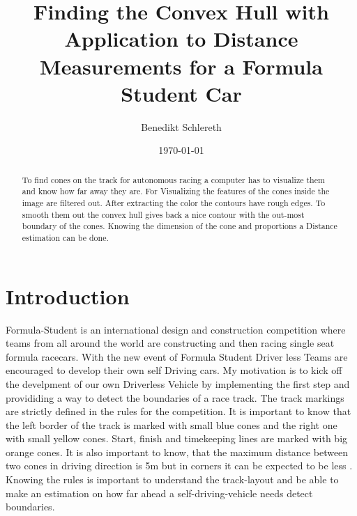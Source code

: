 \documentclass[10pt,a4paper]{article}
\title{Finding the Convex Hull with Application to Distance Measurements for a Formula Student Car}
\author{Benedikt Schlereth}
\date{\today}
\begin{document}
	\maketitle
	\tableofcontents
	\pagebreak
	
	\begin{abstract}
	To find cones on the track for autonomous racing a computer has to visualize them and know how far away they are.
	For Visualizing the features of the cones inside the image are filtered out. After extracting the color the contours have rough edges. To smooth them out the convex hull gives back a nice contour with the out-most boundary of the cones. Knowing the dimension of the cone and proportions a Distance estimation can be done.
	\end{abstract}
	
	\section{Introduction}
	Formula-Student is an international design and construction competition where teams from all around the world are constructing and then racing single seat formula racecars. With	the new event of Formula Student Driver less Teams are encouraged to develop their own self Driving cars.
	My motivation is to kick off the develpment of our own Driverless Vehicle by implementing the first step and provididing a way to detect the boundaries of a race track.
	The track markings are strictly defined in the rules for the competition. It is important to know that the left border of the track is marked with small blue cones and the right one with small yellow cones. 
	Start, finish and timekeeping lines are marked with big orange cones. It is also important to know, that the maximum distance between two cones in driving direction is 5m but in corners it can be expected to be less \cite{rules:handbook}. Knowing the rules is important to understand the track-layout and be able to make an estimation on how far ahead a self-driving-vehicle needs detect boundaries. 
	
\end{document}
